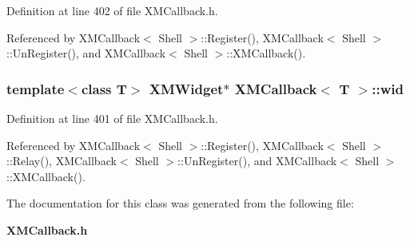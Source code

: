 Definition at line 402 of file XMCallback.h.

Referenced by XMCallback$<$ Shell $>$::Register(), XMCallback$<$ Shell $>$::Un\-Register(), and XMCallback$<$ Shell $>$::XMCallback().
\subsubsection{\setlength{\rightskip}{0pt plus 5cm}template$<$class T$>$ {\bf XMWidget}$\ast$ XMCallback$<$ T $>$::wid\hspace{0.3cm}{\tt  [private]}}\label{classXMCallback_o5}




Definition at line 401 of file XMCallback.h.

Referenced by XMCallback$<$ Shell $>$::Register(), XMCallback$<$ Shell $>$::Relay(), XMCallback$<$ Shell $>$::Un\-Register(), and XMCallback$<$ Shell $>$::XMCallback().

The documentation for this class was generated from the following file:\begin{CompactItemize}
\item 
{\bf XMCallback.h}\end{CompactItemize}
